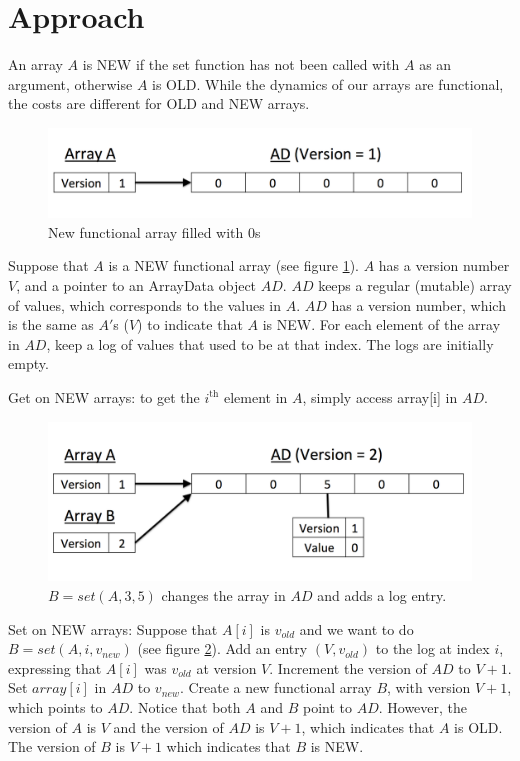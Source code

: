 \documentclass[preprint]{sigplanconf}
\begin{document}
\section{Approach}

An array $A$ is NEW if the set function has not been called with $A$ as an argument, otherwise $A$ is OLD. While the dynamics of our arrays are functional, the costs are different for OLD and NEW arrays. 

\begin{figure}[!ht]
\centering
\includegraphics[scale=0.3]{new_array_A}
\nocaptionrule \caption{New functional array filled with 0s}
\label{fig:new_array_A}
\end{figure}

Suppose that $A$ is a NEW functional array  (see figure \ref{fig:new_array_A}). $A$ has a version number $V$, and a pointer to an ArrayData object $AD$. $AD$ keeps a regular (mutable) array of values, which corresponds to the values in $A$. $AD$ has a version number, which is the same as $A'$s ($V$) to indicate that $A$ is NEW. For each element of the array in $AD$, keep a log of values that used to be at that index. The logs are initially empty.

Get on NEW arrays: to get the $i^{\text{th}}$ element in $A$, simply access array[i] in $AD$.

\begin{figure}[!ht]
\centering
\includegraphics[scale=0.3]{set_A_return_B}
\nocaptionrule \caption{$B = set(A, 3, 5)$ changes the array in $AD$ and adds a log entry.}
\label{fig:set_A_return_B}
\end{figure}

Set on NEW arrays: Suppose that $A[i]$ is $v_{old}$ and we want to do $B = set(A, i, v_{new})$ (see figure \ref{fig:set_A_return_B}). Add an entry $(V, v_{old})$ to the log at index $i$, expressing that $A[i]$ was $v_{old}$ at version $V$. Increment the version of $AD$ to $V+1$. Set $array[i]$ in $AD$ to $v_{new}$. Create a new functional array $B$, with version $V+1$, which points to $AD$. Notice that both $A$ and $B$ point to $AD$. However, the version of $A$ is $V$ and the version of $AD$ is $V+1$, which indicates that $A$ is OLD. The version of $B$ is $V+1$ which indicates that $B$ is NEW.
\end{document}
